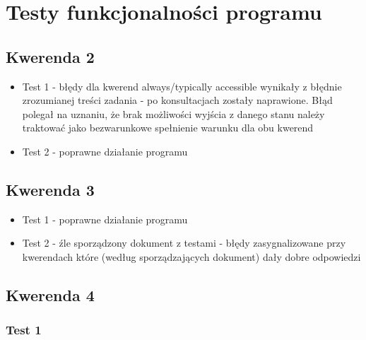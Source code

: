 \documentclass{article}
\begin{document}
\section{Testy funkcjonalności programu}
\subsection{Kwerenda 2}
\begin{itemize}
	\item Test 1 - błędy dla kwerend always/typically accessible wynikały z błędnie zrozumianej treści zadania - po konsultacjach zostały naprawione. Błąd polegał na uznaniu, że brak możliwości wyjścia z danego stanu należy traktować jako bezwarunkowe spełnienie warunku dla obu kwerend
	\item Test 2 - poprawne działanie programu
\end{itemize}
\subsection{Kwerenda 3}
\begin{itemize}
	\item Test 1 - poprawne działanie programu
	\item Test 2 - źle sporządzony dokument z testami - błędy zasygnalizowane przy kwerendach które (według sporządzających dokument) dały dobre odpowiedzi
\end{itemize}
\subsection{Kwerenda 4}
\subsubsection{Test 1}
\end{document}
